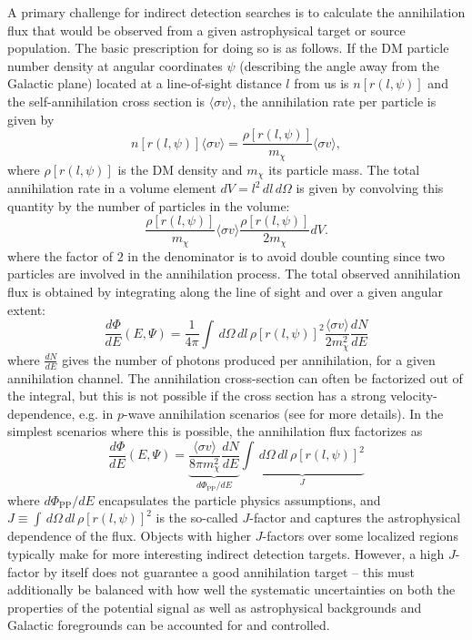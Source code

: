 A primary challenge for indirect detection searches is to calculate the annihilation flux that would be observed from a given astrophysical target or source population. The basic prescription for doing so is as follows. If the DM particle number density at angular coordinates $\psi$ (describing the angle away from the Galactic plane) located at a line-of-sight distance $l$ from us is $n[r(l,\psi)]$ and the self-annihilation cross section is $\langle\sigma v\rangle$, the annihilation rate per particle is given by
\begin{equation}
n[r(l,\psi)]\langle\sigma v\rangle = \frac{\rho[r(l,\psi)]}{m_\chi}\langle\sigma v\rangle,
\end{equation}
where $\rho[r(l,\psi)]$ is the DM density and $m_\chi$ its particle mass. The total annihilation rate in a volume element $dV = l^2\,dl\,d\Omega$ is given by convolving this quantity by the number of particles in the volume:
\begin{equation}
\frac{\rho[r(l,\psi)]}{m_\chi}\langle\sigma v\rangle \frac{\rho[r(l,\psi)]}{2m_\chi}dV.
\end{equation}
where the factor of $2$ in the denominator is to avoid double counting since two particles are involved in the annihilation process. The total observed annihilation flux is obtained by integrating along the line of sight and over a given angular extent:
\begin{equation}
\frac{d\Phi}{dE}(E,\Psi) = \frac{1}{4\pi}\int\,d\Omega\,dl\,\rho[r(l,\psi)]^2\frac{\langle\sigma v\rangle}{2m_\chi^2}\frac{dN}{dE}
\end{equation}
where $\frac{dN}{dE}$ gives the number of photons produced per annihilation, for a given annihilation channel. The annihilation cross-section can often be factorized out of the integral, but this is not possible if the cross section has a strong velocity-dependence, e.g. in $p$-wave annihilation scenarios (see for more details). %
In the simplest scenarios where this is possible, the annihilation flux factorizes as
\begin{equation}
\frac{d\Phi}{dE}(E,\Psi) = \underbrace{\frac{\langle\sigma v\rangle}{8\pi m_\chi^2}\frac{dN}{dE}}_{d\Phi_\mathrm{PP}/dE}\underbrace{\int\,d\Omega\,dl\,\rho[r(l,\psi)]^2}_J
\end{equation}
where $d\Phi_\mathrm{PP}/dE$ encapsulates the particle physics assumptions, and $J\equiv\int\,d\Omega\,dl\,\rho[r(l,\psi)]^2$ is the so-called $J$-factor and captures the astrophysical dependence of the flux. Objects with higher $J$-factors over some localized regions typically make for more interesting indirect detection targets. However, a high $J$-factor by itself does not guarantee a good annihilation target -- this must additionally be balanced with how well the systematic uncertainties on both the properties of the potential signal as well as astrophysical backgrounds and Galactic foregrounds can be accounted for and controlled.

